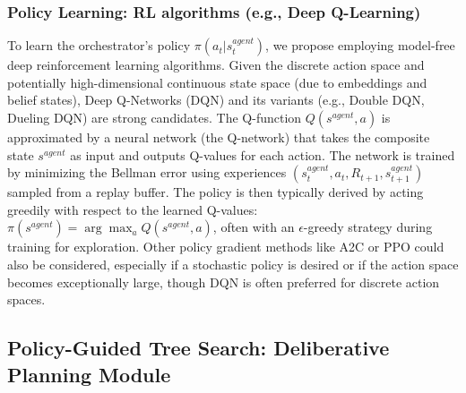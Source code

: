\documentclass[11pt]{article}
\begin{document}
\subsubsection{Policy Learning: RL algorithms (e.g., Deep Q-Learning)}
\label{sssec:mdp_policy_learning}
To learn the orchestrator's policy $\pi(a_t | s_t^{agent})$, we propose employing model-free deep reinforcement learning algorithms. Given the discrete action space and potentially high-dimensional continuous state space (due to embeddings and belief states), Deep Q-Networks (DQN) \citep{Mnih2013PlayingAW, Mnih2015HumanlevelCT} and its variants (e.g., Double DQN, Dueling DQN) are strong candidates.
The Q-function $Q(s^{agent}, a)$ is approximated by a neural network (the Q-network) that takes the composite state $s^{agent}$ as input and outputs Q-values for each action. The network is trained by minimizing the Bellman error using experiences $(s_t^{agent}, a_t, R_{t+1}, s_{t+1}^{agent})$ sampled from a replay buffer.
The policy is then typically derived by acting greedily with respect to the learned Q-values: $\pi(s^{agent}) = \arg\max_a Q(s^{agent}, a)$, often with an $\epsilon$-greedy strategy during training for exploration.
Other policy gradient methods like A2C \citep{Mnih2016AsynchronousMF} or PPO \citep{Schulman2017ProximalPO} could also be considered, especially if a stochastic policy is desired or if the action space becomes exceptionally large, though DQN is often preferred for discrete action spaces.

\subsection{Policy-Guided Tree Search: Deliberative Planning Module}
\label{ssec:tree_search}
\end{document}

